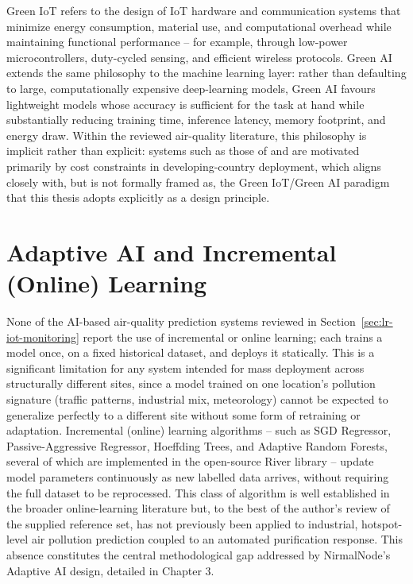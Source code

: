 Green IoT refers to the design of IoT hardware and communication systems that minimize energy consumption, material use, and computational overhead while maintaining functional performance -- for example, through low-power microcontrollers, duty-cycled sensing, and efficient wireless protocols. Green AI extends the same philosophy to the machine learning layer: rather than defaulting to large, computationally expensive deep-learning models, Green AI favours lightweight models whose accuracy is sufficient for the task at hand while substantially reducing training time, inference latency, memory footprint, and energy draw. Within the reviewed air-quality literature, this philosophy is implicit rather than explicit: systems such as those of \citet{alam2025iot} and \citet{shabbir2025paradigm} are motivated primarily by cost constraints in developing-country deployment, which aligns closely with, but is not formally framed as, the Green IoT/Green AI paradigm that this thesis adopts explicitly as a design principle.

\section{Adaptive AI and Incremental (Online) Learning}
\label{sec:lr-adaptive-ai}

None of the AI-based air-quality prediction systems reviewed in Section~\ref{sec:lr-iot-monitoring} report the use of incremental or online learning; each trains a model once, on a fixed historical dataset, and deploys it statically. This is a significant limitation for any system intended for mass deployment across structurally different sites, since a model trained on one location's pollution signature (traffic patterns, industrial mix, meteorology) cannot be expected to generalize perfectly to a different site without some form of retraining or adaptation. Incremental (online) learning algorithms -- such as SGD Regressor, Passive-Aggressive Regressor, Hoeffding Trees, and Adaptive Random Forests, several of which are implemented in the open-source River library -- update model parameters continuously as new labelled data arrives, without requiring the full dataset to be reprocessed. This class of algorithm is well established in the broader online-learning literature but, to the best of the author's review of the supplied reference set, has not previously been applied to industrial, hotspot-level air pollution prediction coupled to an automated purification response. This absence constitutes the central methodological gap addressed by NirmalNode's Adaptive AI design, detailed in Chapter 3.

